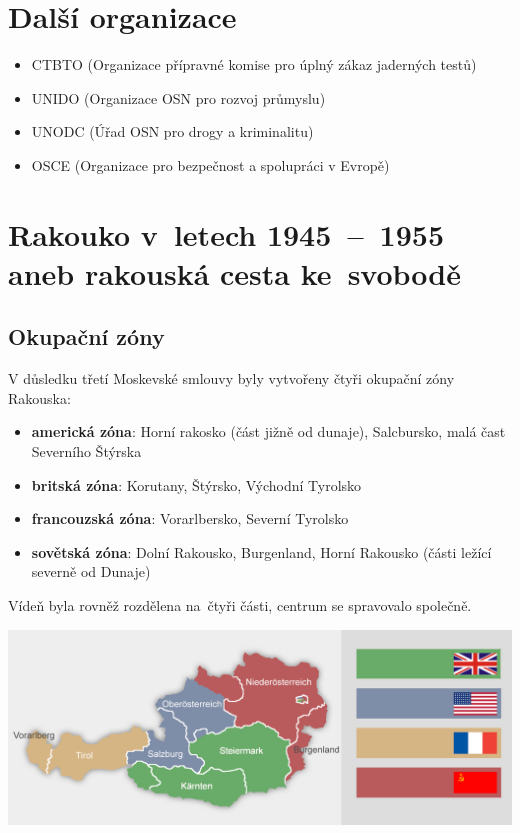 \documentclass[a2 paper]{article}
\begin{document}
\begin{landscape}
\begin{minipage}[c]{\linewidth}
\begin{minipage}[t]{0.2\linewidth}
	\section*{Další organizace}
	\begin{itemize}
		\item CTBTO (Organizace přípravné komise pro úplný zákaz jaderných testů)
		\item UNIDO (Organizace OSN pro rozvoj průmyslu)
		\item UNODC (Úřad OSN pro drogy a kriminalitu)
		\item OSCE (Organizace pro bezpečnost a spolupráci v Evropě)
	\end{itemize}
\end{minipage}
\hspace{0.5cm}
\begin{minipage}[t]{0.5\linewidth}
	\section*{Rakouko v~letech 1945~--~1955 aneb rakouská cesta ke~svobodě}
	\subsection*{Okupační zóny}
	V důsledku třetí Moskevské smlouvy byly vytvořeny čtyři okupační zóny Rakouska:
	\begin{itemize}
		\item \textbf{americká zóna}: Horní rakosko (část jižně od dunaje), Salcbursko, malá čast Severního Štýrska
		\item \textbf{britská zóna}: Korutany, Štýrsko, Východní Tyrolsko
		\item \textbf{francouzská zóna}: Vorarlbersko, Severní Tyrolsko
		\item \textbf{sovětská zóna}: Dolní Rakousko, Burgenland, Horní Rakousko (části ležící severně od Dunaje)
	\end{itemize}
	Vídeň byla rovněž rozdělena na~čtyři části, centrum se spravovalo společně. 

	\begin{minipage}[t]{\linewidth}


\includegraphics[width=\linewidth]{images/okupacniZony.png}


\end{minipage}
\end{minipage}
\end{minipage}
\end{landscape}
\end{document}
